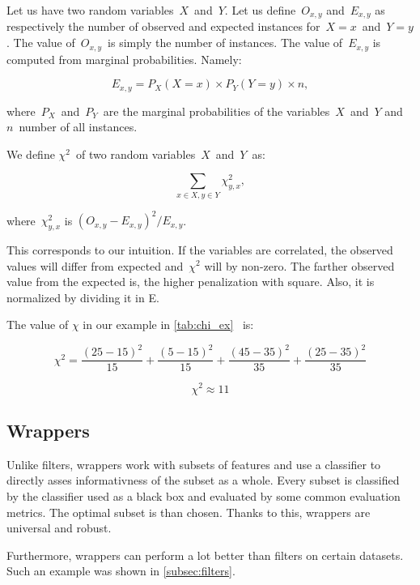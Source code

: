 Let us have two random variables~$X$~and~$Y$.
Let us define~$O_{x,y}$ and~$E_{x,y}$
as respectively the number of observed and expected instances for~$X=x$~and~$Y=y$.
The value of~$O_{x,y}$~is simply the number of instances.
The value of~$E_{x,y}$ is computed from marginal probabilities.
Namely:

\begin{equation}
E_{x,y} = P_X(X=x) \times P_Y(Y=y) \times n,
\end{equation}

where~$P_X$~and~$P_Y$~are the marginal probabilities of the variables~$X$~and~$Y$
and~$n$~number of all instances.

We define $\chi^2$~of two random variables~$X$~and~$Y$~as:

$$\sum_{x \in X, y \in Y}{\chi^2_{y,x}},$$

where~${\chi^2_{y,x}}$ is $\left(O_{x,y} - E_{x,y} \right)^ 2 / E_{x,y}$.

This corresponds to our intuition.
If the variables are correlated,
the observed values will differ from expected and~$\chi^2$ will by non-zero.
The farther observed value from the expected is, the higher penalization with square.
Also, it is normalized by dividing it in E.

The value of $\chi$ in our example in \autoref{tab:chi_ex}
~is:

\begin{equation}
\chi^2 = 
\frac{\left(25-15\right)^2}{15} +
\frac{\left(5-15\right)^2}{15} +
\frac{\left(45-35\right)^2}{35} +
\frac{\left(25-35\right)^2}{35}
\end{equation}

\begin{equation}
\chi^2 \approx 11
\end{equation}



\subsection{Wrappers}

Unlike filters, wrappers work with subsets of features
and use a classifier to directly asses informativness of the subset as a whole.
Every subset is classified by the classifier used as a black box
and evaluated by some common evaluation metrics.
The optimal subset is than chosen.
Thanks to this, wrappers are universal and robust.

Furthermore, wrappers can perform a lot better than filters on certain datasets.
Such an example was shown in \autoref{subsec:filters}.


